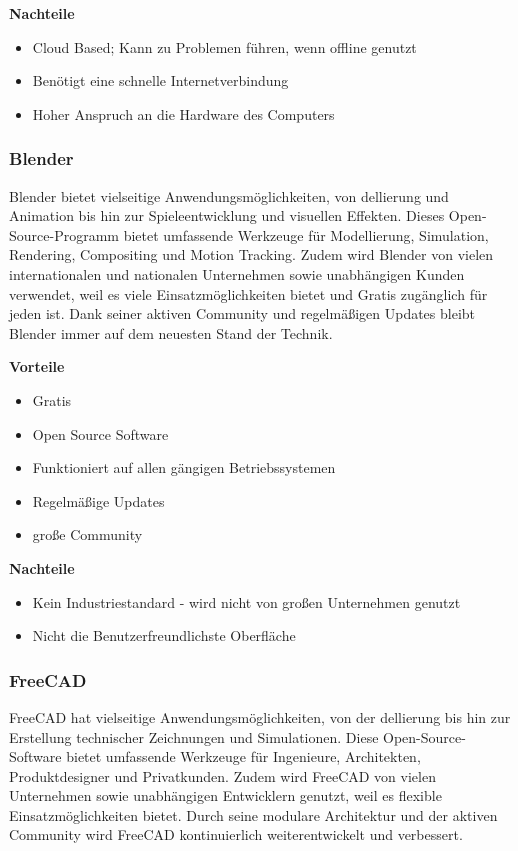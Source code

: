 \textbf{Nachteile}
\begin{itemize}
	\item Cloud Based; Kann zu Problemen führen, wenn offline genutzt 
	\item Benötigt eine schnelle Internetverbindung
	\item Hoher Anspruch an die Hardware des Computers
\end{itemize}
\cite{AutodeskFusionReviews}


\subsubsection{Blender} 
Blender bietet vielseitige Anwendungsmöglichkeiten, von dellierung und Animation bis hin zur Spieleentwicklung und visuellen Effekten. Dieses Open-Source-Programm bietet umfassende Werkzeuge für Modellierung, Simulation, Rendering, Compositing und Motion Tracking. Zudem wird Blender von vielen internationalen und nationalen Unternehmen sowie unabhängigen Kunden verwendet, weil es viele Einsatzmöglichkeiten bietet und Gratis zugänglich für jeden ist. Dank seiner aktiven Community und regelmäßigen Updates bleibt Blender immer auf dem neuesten Stand der Technik. \\
\cite{Blender}

\textbf{Vorteile}
\begin{itemize}
	\item Gratis 
	\item Open Source Software
	\item Funktioniert auf allen gängigen Betriebssystemen
	\item Regelmäßige Updates
	\item große Community
\end{itemize}

\textbf{Nachteile}
\begin{itemize}
	\item Kein Industriestandard - wird nicht von großen Unternehmen genutzt
	\item Nicht die Benutzerfreundlichste Oberfläche
\end{itemize}
\cite{BlenderPros&Cons}


\subsubsection{FreeCAD}
FreeCAD hat vielseitige Anwendungsmöglichkeiten, von der dellierung bis hin zur Erstellung technischer Zeichnungen und Simulationen. Diese Open-Source-Software bietet umfassende Werkzeuge für Ingenieure, Architekten, Produktdesigner und Privatkunden. Zudem wird FreeCAD von vielen Unternehmen sowie unabhängigen Entwicklern genutzt, weil es flexible Einsatzmöglichkeiten bietet. Durch seine modulare Architektur und der aktiven Community wird FreeCAD kontinuierlich weiterentwickelt und verbessert. \\
\cite{FreeCAD}  \cite{FreeCAD_2}

